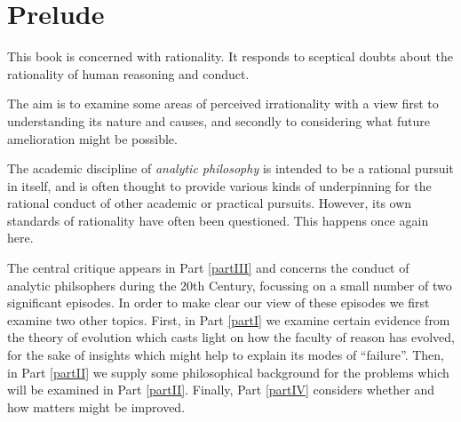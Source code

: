 \mainmatter
\def\rbjidprelude{$$Id: prelude.tex,v 1.6 2010/04/05 16:05:16 rbj Exp $$}

\chapter*{Prelude}\label{Prelude}

This book is concerned with rationality.
It responds to sceptical doubts about the rationality of human reasoning and conduct.

The aim is to examine some areas of perceived irrationality with a view first to understanding its nature and causes, and secondly to considering what future amelioration might be possible.

The academic discipline of \emph{analytic philosophy} is intended to be a rational pursuit in itself, and is often thought to provide various kinds of underpinning for the rational conduct of other academic or practical pursuits.
However, its own standards of rationality have often been questioned.
This happens once again here.

The central critique appears in Part \ref{partIII} and concerns the conduct of analytic philsophers during the 20th Century, focussing on a small number of two significant episodes.
In order to make clear our view of these episodes we first examine two other topics.
First, in Part \ref{partI} we examine certain evidence from the theory of evolution which casts light on how the faculty of reason has evolved, for the sake of insights which might help to explain its modes of ``failure''.
Then, in Part \ref{partII} we supply some philosophical background for the problems which will be examined in Part \ref{partII}.
Finally, Part \ref{partIV} considers whether and how matters might be improved.

